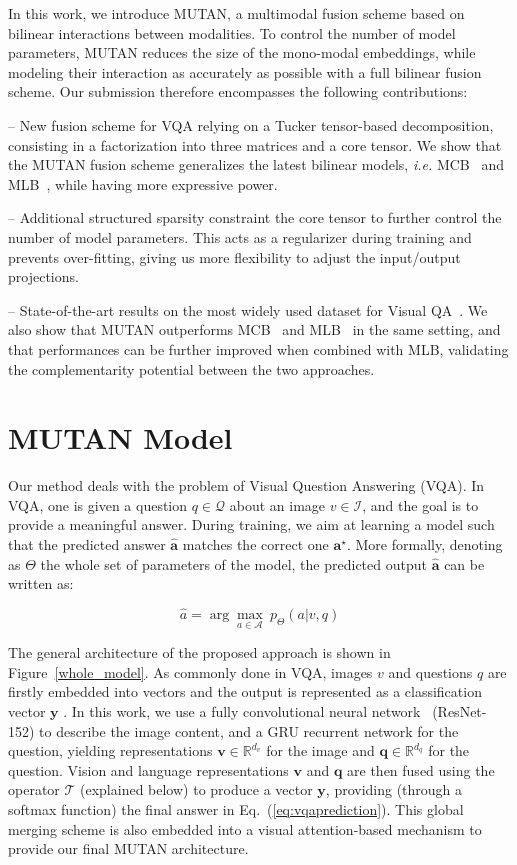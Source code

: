 \documentclass[10pt,twocolumn,letterpaper]{article}
\newcommand{\tens}[1]{
\bm{\mathcal{#1}}
}
\newcommand{\q}{\mathbf{q}}
\newcommand{\vv}{\mathbf{v}}
\newcommand{\y}{\mathbf{y}}
\begin{document}
In this work, we introduce MUTAN, a multimodal fusion scheme based on bilinear interactions between modalities. 
To control the number of model parameters, MUTAN reduces the size of the mono-modal embeddings, while modeling their interaction as accurately as possible with a full bilinear fusion scheme. 
Our submission therefore encompasses the following contributions:

-- New fusion scheme for VQA relying on a Tucker tensor-based decomposition, consisting in a factorization into three matrices and a core tensor. 
We show that the MUTAN fusion scheme generalizes the latest bilinear models, \textit{i.e.} MCB~\cite{fukui16mcb} and MLB~\cite{Kim2017}, while having more expressive power. 
 
 -- Additional structured sparsity constraint the core tensor to further control the number of model parameters. This acts as a regularizer during training and prevents over-fitting, giving us more flexibility to adjust the input/output projections.
 
 -- State-of-the-art results on the most widely used dataset for Visual QA~\cite{VQA}. 
We also show that MUTAN outperforms MCB~\cite{fukui16mcb} and MLB~\cite{Kim2017} in the same setting, and that performances can be further improved when combined with MLB, validating the complementarity potential
between the two approaches.  

 \section{MUTAN Model}
\label{sec:model}
Our method deals with the problem of Visual Question Answering (VQA). 
In VQA, one is given a  question $q \in \mathcal{Q}$ about an image $v \in \mathcal{I}$, and the goal is to provide a meaningful answer.
During training, we aim at learning a model such that
the predicted answer $\hat{\mathbf{a}}$ matches the correct one $\mathbf{a}^\star$. 
More formally, denoting as $\Theta$ the whole set of parameters of the model, the predicted output $\hat{\mathbf{a}}$ can be written as:

\begin{equation}
\label{eq:vqaprediction}
\hat{a} = \arg \underset{a \in \mathcal{A}} \max ~ p_{\Theta}\left( a | v,q \right)  
\end{equation}

The general architecture of the proposed approach is shown in Figure~\ref{whole_model}. 
As commonly done in VQA, images $v$ and questions $q$ are firstly embedded into vectors and the output is represented as a classification vector $\y$ . In this work, we use a fully convolutional neural network~\cite{He2015} (ResNet-152) to describe the image content,
and a GRU recurrent network \cite{Kiros2015, ChoMBB14} for the question, yielding representations $\vv \in \mathbb{R}^{d_v}$ for the image and $\q \in \mathbb{R}^{d_q}$ for the question.
Vision and language representations $\vv$ and $\q$ are then fused using the operator $\tens{T}$ (explained below) to produce a vector $\y$, providing (through a softmax function) the final answer in Eq.~(\ref{eq:vqaprediction}). This global merging scheme is also embedded into a visual attention-based mechanism \cite{Kim2017} to provide our final MUTAN architecture.
\end{document}
